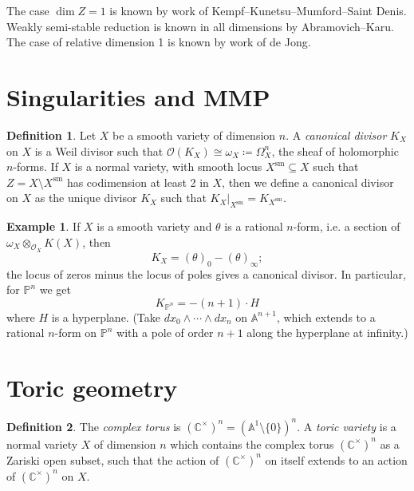 \documentclass{article}
\theoremstyle{definition}
\newtheorem*{definition}{Definition}
\newtheorem*{example}{Example}
\newcommand{\sm}{\mathrm{sm}}
\renewcommand{\O}{\mathcal{O}}
\newcommand{\A}{\mathbb{A}}
\renewcommand{\P}{\mathbb{P}}
\newcommand{\C}{\mathbb{C}}
\begin{document}
The case $\dim Z=1$ is known by work of Kempf--Kunetsu--Mumford--Saint Denis.
Weakly semi-stable reduction is known in all dimensions by Abramovich--Karu.
The case of relative dimension 1 is known by work of de Jong.

\section*{Singularities and MMP}

\begin{definition}
    Let $X$ be a smooth variety of dimension $n$. A \emph{canonical divisor}
    $K_X$ on $X$ is a Weil divisor such that
    $\O(K_X)\cong\omega_X\coloneq\Omega_X^n$, the sheaf of holomorphic
    $n$-forms. If $X$ is a normal variety, with smooth locus $X^\sm\subseteq X$
    such that $Z=X\setminus X^\sm$ has codimension at least 2 in $X$, then we
    define a canonical divisor on $X$ as the unique divisor $K_X$ such that
    $K_X|_{X^\sm}=K_{X^\sm}$.
\end{definition}

\begin{example}
    If $X$ is a smooth variety and $\theta$ is a rational $n$-form, i.e. a
    section of $\omega_X\otimes_{\O_X}K(X)$, then
    \begin{equation*}
        K_X = (\theta)_0 - (\theta)_\infty;
    \end{equation*}
    the locus of zeros minus the locus of poles gives a canonical divisor. In
    particular, for $\P^n$ we get
    \begin{equation*}
        K_{\P^n} = -(n+1)\cdot H
    \end{equation*}
    where $H$ is a hyperplane. (Take $dx_0\wedge\cdots\wedge dx_n$ on
    $\A^{n+1}$, which extends to a rational $n$-form on $\P^n$ with a pole of
    order $n+1$ along the hyperplane at infinity.)
\end{example}

\section*{Toric geometry}

\begin{definition}
    The \emph{complex torus} is $(\C^\times)^n=(\A^1\setminus\{0\})^n$. A
    \emph{toric variety} is a normal variety $X$ of dimension $n$ which contains
    the complex torus $(\C^\times)^n$ as a Zariski open subset, such that the
    action of $(\C^\times)^n$ on itself extends to an action of $(\C^\times)^n$
    on $X$.
\end{definition}
\end{document}
